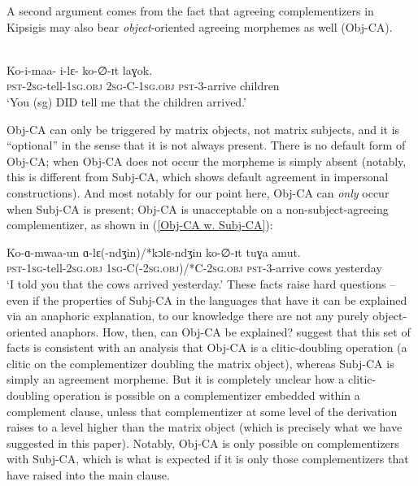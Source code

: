 \documentclass[output=paper
,modfonts
,nonflat
]{langsci/langscibook}
\begin{document}
A second argument comes from the fact that agreeing complementizers in Kipsigis may also bear \textit{object}-oriented agreeing morphemes as well (Obj-CA). 

\ea \label{ObjCAExample} 
\\
\gll Ko-i-maa- i-lɛ- ko-∅-ɪt laɣok. \\
\textsc{pst}-2\textsc{sg}-tell-1\textsc{sg}.\textsc{obj} 2\textsc{sg}-C-1\textsc{sg}.\textsc{obj} \textsc{pst}-3-arrive children \\ 
\glt `You (sg) DID tell me that the children arrived.'
\z

\noindent Obj-CA can only be triggered by matrix objects, not matrix subjects, and it is ``optional'' in the sense that it is not always present. There is no default form of Obj-CA; when Obj-CA does not occur the morpheme is simply absent (notably, this is different from Subj-CA, which shows default agreement in impersonal constructions). And most notably for our point here, Obj-CA can \textit{only} occur when Subj-CA is present; Obj-CA is unacceptable on a non-subject-agreeing complementizer, as shown in (\ref{Obj-CA w. Subj-CA}): 

\ea \label{Obj-CA w. Subj-CA}
\gll Ko-ɑ-mwaa-un ɑ-lɛ(-ndʒin)/*kɔlɛ-ndʒin ko-∅-ɪt tuɣa amut. \\
\textsc{pst}-1\textsc{sg}-tell-2\textsc{sg}.\textsc{obj} 1\textsc{sg}-C(-2\textsc{sg}.\textsc{obj})/*C-2\textsc{sg}.\textsc{obj} \textsc{pst}-3-arrive cows yesterday \\
\glt `I told you that the cows arrived yesterday.'
\z
\noindent These facts raise hard questions -- even if the properties of Subj-CA in the languages that have it can be explained via an anaphoric explanation, to our knowledge there are not any purely object-oriented anaphors. How, then, can Obj-CA be explained? \citet{DiercksRao:2017} suggest that this set of facts is consistent with an analysis that Obj-CA is a clitic-doubling operation (a clitic on the complementizer doubling the matrix object), whereas Subj-CA is simply an agreement morpheme. But it is completely unclear how a clitic-doubling operation is possible on a complementizer embedded within a complement clause, unless that complementizer at some level of the derivation raises to a level higher than the matrix object (which is precisely what we have suggested in this paper). Notably, Obj-CA is only possible on complementizers with Subj-CA, which is what is expected if it is only those complementizers that have raised into the main clause.  
\end{document}
